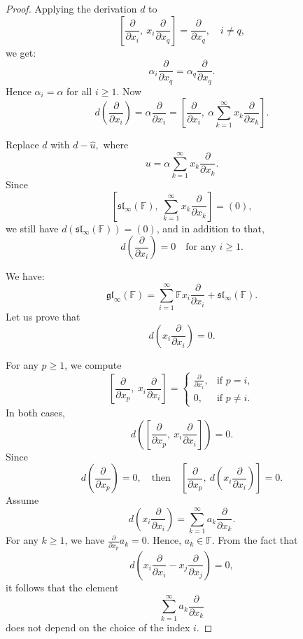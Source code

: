 \documentclass[12pt,a4paper]{amsart}
\theoremstyle{plain}
\begin{document}
\begin{proof}
		
		Applying the derivation $d$ to
		\[
		\left[ \frac{\partial}{\partial x_i}, \ x_i  \frac{\partial}{\partial x_q} \right] = \frac{\partial}{\partial x_q}, \quad i \neq q,
		\] we get: $$ \alpha_i   \frac{\partial}{\partial x_q}= \alpha_q   \frac{\partial}{\partial x_q}.$$ Hence $ \alpha_i =\alpha$  for all $ i\geq 1. $ Now
		\[
		d\left( \frac{\partial}{\partial x_i} \right) = \alpha  \frac{\partial}{\partial x_i} = \left[ \frac{\partial}{\partial x_i}, \ \alpha \sum_{k=1}^{\infty}  x_k  \frac{\partial}{\partial x_k} \right].
		\]
		
		
		Replace \( d \) with $  d - \widehat{u} ,$ where $$ u= \alpha \sum_{k=1}^\infty x_k \frac{\partial}{\partial x_k}.$$
		Since
		\[
		\left[\mathfrak{sl}_\infty(\mathbb{F}), \ \sum_{k=1}^\infty x_k \frac{\partial}{\partial x_k}\right] = (0),
		\]
		we still have \( d(\mathfrak{sl}_\infty(\mathbb{F})) = (0) \),  and in addition to that,
		\[
		d\left( \frac{\partial}{\partial x_i} \right) = 0 \quad \text{for any } i \geq 1.
		\]
		
		We have:
		\[
		\mathfrak{gl}_\infty(\mathbb{F}) = \sum_{i=1}^\infty \mathbb{F} x_i \frac{\partial}{\partial x_i} + \mathfrak{sl}_\infty(\mathbb{F}).
		\] Let us prove that \[
		d\left( x_i \frac{\partial}{\partial x_i}\right) = 0.
		\] 
		
		For any \( p \geq 1 \), we compute
		\[
		\left[ \frac{\partial}{\partial x_p}, \ x_i \frac{\partial}{\partial x_i} \right] =
		\begin{cases}
			\frac{\partial}{\partial x_i}, & \text{if } p = i, \\
			0, & \text{if } p \neq i.
		\end{cases}
		\] In both cases,
		\[
		d\left( \left[ \frac{\partial}{\partial x_p}, \ x_i \frac{\partial}{\partial x_i} \right] \right) = 0.
		\]
		Since $$ d\left( \frac{\partial}{\partial x_p} \right) = 0,  \quad \text{then} \quad 
		\left[ \frac{\partial}{\partial x_p},\  d \left( x_i \frac{\partial}{\partial x_i} \right) \right] = 0.$$
		Assume
		\[
		d \left( x_i \frac{\partial}{\partial x_i} \right) = \sum_{k=1}^{\infty} a_k \frac{\partial}{\partial x_k}.
		\]
		For any \( k \geq 1 \), we have \( \frac{\partial}{\partial x_p} a_k = 0 \). Hence, \( a_k \in \mathbb{F} \). From the fact that 
		\[
		d \left( x_i \frac{\partial}{\partial x_i} - x_j \frac{\partial}{\partial x_j} \right) = 0,
		\]
		it follows that the element 
		\[
		\sum_{k = 1}^{\infty} a_k \frac{\partial}{\partial x_k}
		\]
		does not depend on the choice of the index  \( i \).
		

\end{proof}
\end{document}
